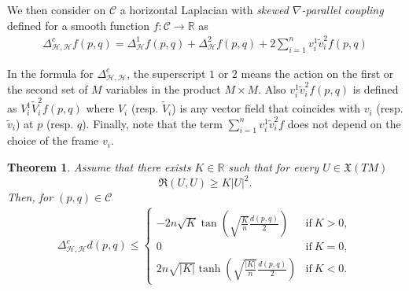 \documentclass[11pt]{article}
\numberwithin{equation}{section}
\newtheorem{theorem}{Theorem}[section]
\newcommand{\Ho}{\mathcal H}
\begin{document}
We then consider on $\mathcal{C}$ a horizontal Laplacian with \textit{skewed $\nabla$-parallel coupling} defined for a smooth function $f :\mathcal{C} \to \mathbb R$ as
\begin{align}\label{coupled laplacian}
\Delta^c_{\Ho,\Ho} f (p,q)=\Delta^1_{\Ho} f (p,q)+\Delta^2_{\Ho} f (p,q) +2 \sum_{i=1}^n v_i^1 \tilde{v}_i^2 f(p,q)
\end{align}

In the formula for $\Delta^c_{\Ho,\Ho}$, the superscript $1$ or $2$ means the action on the first or the second set of $M$ variables in the product $M\times M$. Also $v_i^1 \tilde{v}_i^2 f(p,q)$ is defined as $V_i^1 \tilde{V}_i^2 f (p,q)$ where $V_i$ (resp. $\tilde{V}_i$) is any vector field that coincides with $v_i$ (resp. $\tilde{v}_i$) at $p$ (resp. $q$). Finally, note that the term $ \sum_{i=1}^n v_i^1 \tilde{v}_i^2 f$  does not depend on the choice of the frame $v_i$. 

\begin{theorem}\label{comparison coupled laplacian}
 Assume that there exists $K \in \mathbb{R}$ such that for every $U \in \mathfrak{X}(TM)$
\[
\mathfrak{R}(U,U) \ge K |U|^2.
\] 
Then, for $(p,q) \in \mathcal{C}$
\begin{align*}
\Delta^c_{\Ho,\Ho} d (p,q) \le 
\begin{cases}
 -2n\sqrt{K} \tan \left(\sqrt{\frac{K}{n}} \frac{d(p,q)}{2} \right) &\text{if}\ K>0,
\\
0&\text{if}\ K = 0,
\\
 2n\sqrt{|K|} \tanh \left(\sqrt{\frac{|K|}{n}} \frac{d(p,q)}{2} \right) &\text{if}\ K<0.
\end{cases}
\end{align*}
\end{theorem}
\end{document}
